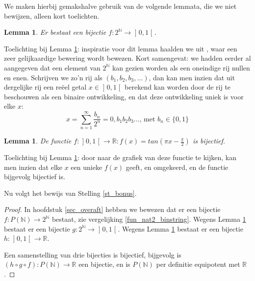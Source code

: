 \documentclass[hidelinks,11pt,a4paper]{article}
\newtheorem{lemma}[stelling]{Lemma}
\begin{document}
We maken hierbij gemakshalve gebruik van de volgende lemmata, die we niet bewijzen, alleen kort toelichten.  

\begin{lemma}
\label{lemma_2N_int01} 
Er bestaat een bijectie $f: 2^{\mathbb{N}} \to \mathopen]0,1\mathclose[ $. 
\end{lemma}
Toelichting bij Lemma \ref{lemma_2N_int01}: inspiratie voor dit lemma haalden we uit \cite{youtube_penn}, waar een zeer gelijkaardige bewering wordt bewezen. 
Kort samengevat: we hadden eerder al aangegeven dat een element van $2^{\mathbb{N}}$ kan gezien worden als een oneindige rij nullen en enen. 
Schrijven we zo'n rij als  $(b_1, b_2, b_3, ...)$, dan kan men inzien dat uit dergelijke rij een re\"eel getal $x \in \mathopen]0,1\mathclose[$ berekend kan worden door de rij te beschouwen als een binaire ontwikkeling, en dat deze ontwikkeling uniek is voor elke $x$: 
\[ 
x = \sum_{n=1}^{\infty}{\frac{b_n}{2^n}} = 0,b_1 b_2 b_3 ...  \text{, met } b_n \in \{0,1\} 
\] 

\begin{lemma}
\label{lemma_int01_R} 
De functie $f: \mathopen]0,1\mathclose[ \to \mathbb{R} : f(x) = tan(\pi x - \frac{\pi}{2})$ is bijectief. 
\end{lemma}
Toelichting bij Lemma \ref{lemma_int01_R}: door naar de grafiek van deze functie te kijken, kan men inzien dat elke $x$ een unieke $f(x)$ geeft, en omgekeerd, en de functie bijgevolg bijectief is. 

Nu volgt het bewijs van Stelling \ref{st_bonus}. 
\begin{proof}
In hoofdstuk \ref{sec_overaft} hebben we bewezen dat er een bijectie $f: P(\mathbb{N}) \to  2^{\mathbb{N}}$ bestaat, zie vergelijking \eqref{fun_nat2_binstring}. 
Wegens Lemma \ref{lemma_2N_int01} bestaat er een bijectie 
$g: 2^{\mathbb{N}} \to \mathopen]0,1\mathclose[ $. 
Wegens Lemma \ref{lemma_int01_R} bestaat er een bijectie 
$h: \mathopen]0,1\mathclose[ \to \mathbb{R}$. 

Een samenstelling van drie bijecties is bijectief, bijgevolg is $(h \circ g \circ f): P(\mathbb{N}) \to  \mathbb{R}  $ een bijectie, en is $P(\mathbb{N})$ 
per definitie equipotent met $\mathbb{R}$ . 
\end{proof}
\end{document}
